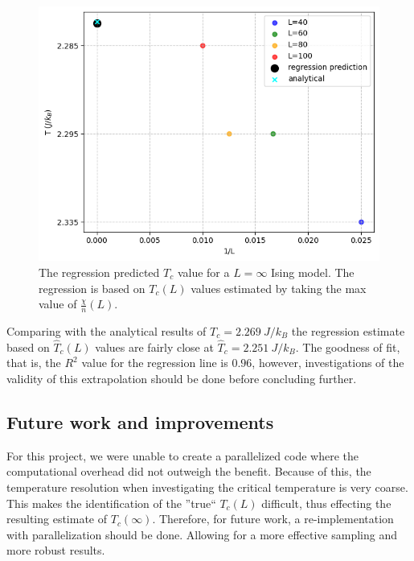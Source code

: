 \documentclass[../main_proj4_correct_template.tex]{subfiles}
\begin{document}
\begin{figure}[h!]
    \centering
    \includegraphics[width=0.9\linewidth]{Project 4/figures/p9_predictedTc.png}
    \caption{The regression predicted $T_c$ value for a $L=\infty$ Ising model. The regression is based on $T_c(L)$ values estimated by taking the max value of $\frac{\chi}{n}(L)$.}
    \label{fig:p4regression_predictedTc}
\end{figure}

Comparing with the analytical results of $T_c=2.269~J/k_B$ the regression estimate based on $\hat{T}_c(L)$ values are fairly close at $\hat{T}_c=2.251~J/k_B$. The goodness of fit, that is, the $R^{2}$ value for the regression line is $0.96$, however, investigations of the validity of this extrapolation should be done before concluding further.

\subsection{Future work and improvements}\label{sec:future_work}

For this project, we were unable to create a parallelized code where the computational overhead did not outweigh the benefit. Because of this, the temperature resolution when investigating the critical temperature is very coarse. This makes the identification of the ''true`` $T_c(L)$ difficult, thus effecting the resulting estimate of $T_c(\infty)$. Therefore, for future work, a re-implementation with parallelization should be done. Allowing for a more effective sampling and more robust results.
\end{document}
